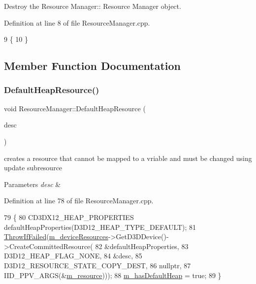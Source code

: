 Destroy the Resource Manager\+:\+: Resource Manager object. 



Definition at line 8 of file Resource\+Manager.\+cpp.


\begin{DoxyCode}
9 \{
10 \}
\end{DoxyCode}


\subsection{Member Function Documentation}
\mbox{\label{class_resource_manager_a9974fc877935a9b41e2416143fe8e72b}} 
\subsubsection{\texorpdfstring{Default\+Heap\+Resource()}{DefaultHeapResource()}}
{\footnotesize\ttfamily void Resource\+Manager\+::\+Default\+Heap\+Resource (\begin{DoxyParamCaption}\item[{D3\+D12\+\_\+\+R\+E\+S\+O\+U\+R\+C\+E\+\_\+\+D\+E\+SC}]{desc }\end{DoxyParamCaption})}



creates a resource that cannot be mapped to a vriable and must be changed using update subresource 


\begin{DoxyParams}{Parameters}
{\em desc} & \\
\hline
\end{DoxyParams}


Definition at line 78 of file Resource\+Manager.\+cpp.


\begin{DoxyCode}
79 \{
80     CD3DX12\_HEAP\_PROPERTIES defaultHeapProperties(D3D12\_HEAP\_TYPE\_DEFAULT);
81     \mbox{\hyperlink{_direct_x_helper_8h_abca3eeca6b5772a1112e0a9a9e3d9013}{ThrowIfFailed}}(\mbox{\hyperlink{class_resource_manager_a91ec892c6045e5911c24c80b4112cad4}{m\_deviceResources}}->GetD3DDevice()->CreateCommittedResource(
82         &defaultHeapProperties,
83         D3D12\_HEAP\_FLAG\_NONE,
84         &desc,
85         D3D12\_RESOURCE\_STATE\_COPY\_DEST,
86         \textcolor{keyword}{nullptr},
87         IID\_PPV\_ARGS(&\mbox{\hyperlink{class_resource_manager_a2190eea97044904955f1fead12732be5}{m\_resource}})));
88     \mbox{\hyperlink{class_resource_manager_ab6e43dce874459d3b2c422959158f0d3}{m\_hasDefaultHeap}} = \textcolor{keyword}{true};
89 \}
\end{DoxyCode}
\mbox{\label{class_resource_manager_a0d93b29422a5f9eac0115254edb4327a}} 
